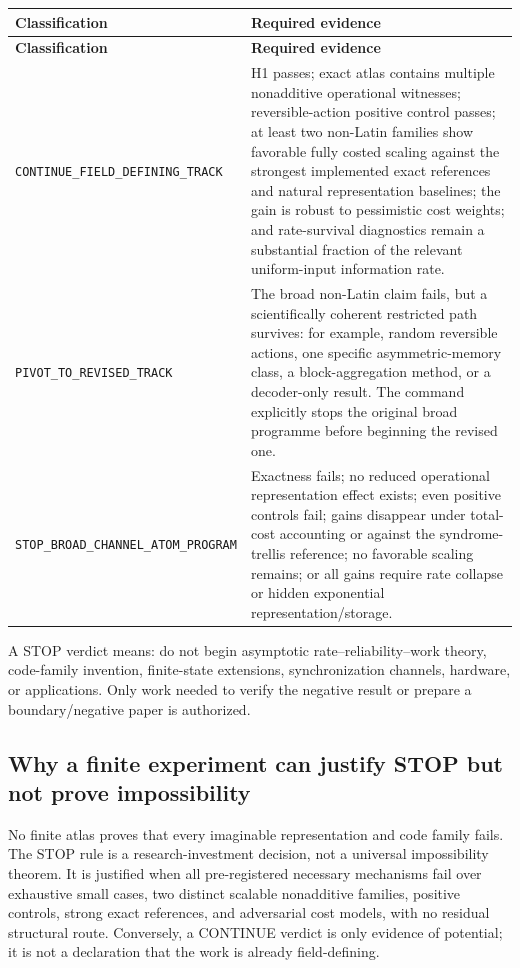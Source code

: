 \documentclass[11pt]{article}
\theoremstyle{definition}
\theoremstyle{remark}
\begin{document}
\begin{longtable}{@{}L{0.22\textwidth}L{0.70\textwidth}@{}}
\toprule
\textbf{Classification} & \textbf{Required evidence}\\
\midrule
\endfirsthead
\toprule
\textbf{Classification} & \textbf{Required evidence}\\
\midrule
\endhead
{\footnotesize\nolinkurl{CONTINUE_FIELD_DEFINING_TRACK}} & H1 passes; exact atlas contains multiple nonadditive operational witnesses; reversible-action positive control passes; at least two non-Latin families show favorable fully costed scaling against the strongest implemented exact references and natural representation baselines; the gain is robust to pessimistic cost weights; and rate-survival diagnostics remain a substantial fraction of the relevant uniform-input information rate.\\[3pt]
{\footnotesize\nolinkurl{PIVOT_TO_REVISED_TRACK}} & The broad non-Latin claim fails, but a scientifically coherent restricted path survives: for example, random reversible actions, one specific asymmetric-memory class, a block-aggregation method, or a decoder-only result. The command explicitly stops the original broad programme before beginning the revised one.\\[3pt]
{\footnotesize\nolinkurl{STOP_BROAD_CHANNEL_ATOM_PROGRAM}} & Exactness fails; no reduced operational representation effect exists; even positive controls fail; gains disappear under total-cost accounting or against the syndrome-trellis reference; no favorable scaling remains; or all gains require rate collapse or hidden exponential representation/storage.\\
\bottomrule
\end{longtable}

\begin{stopbox}
A STOP verdict means: do not begin asymptotic rate--reliability--work theory, code-family invention, finite-state extensions, synchronization channels, hardware, or applications. Only work needed to verify the negative result or prepare a boundary/negative paper is authorized.
\end{stopbox}

\subsection{Why a finite experiment can justify STOP but not prove impossibility}

No finite atlas proves that every imaginable representation and code family fails. The STOP rule is a research-investment decision, not a universal impossibility theorem. It is justified when all pre-registered necessary mechanisms fail over exhaustive small cases, two distinct scalable nonadditive families, positive controls, strong exact references, and adversarial cost models, with no residual structural route. Conversely, a CONTINUE verdict is only evidence of potential; it is not a declaration that the work is already field-defining.
\end{document}
